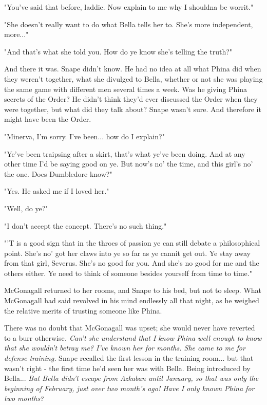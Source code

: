 "You've said that before, laddie. Now explain to me why I shouldna be worrit."

"She doesn't really want to do what Bella tells her to. She's more independent, more..."

"And that's what she told you. How do ye know she's telling the truth?"

And there it was. Snape didn't know. He had no idea at all what Phina did when they weren't together, what she divulged to Bella, whether or not she was playing the same game with different men several times a week. Was he giving Phina secrets of the Order? He didn't think they'd ever discussed the Order when they were together, but what did they talk about? Snape wasn't sure. And therefore it might have been the Order.

"Minerva, I'm sorry. I've been... how do I explain?"

"Ye've been traipsing after a skirt, that's what ye've been doing. And at any other time I'd be saying good on ye. But now's no' the time, and this girl's no' the one. Does Dumbledore know?"

"Yes. He asked me if I loved her."

"Well, do ye?"

"I don't accept the concept. There's no such thing."

"'T is a good sign that in the throes of passion ye can still debate a philosophical point. She's no' got her claws into ye so far as ye cannit get out. Ye stay away from that girl, Severus. She's no good for you. And she's no good for me and the others either. Ye need to think of someone besides yourself from time to time."

McGonagall returned to her rooms, and Snape to his bed, but not to sleep. What McGonagall had said revolved in his mind endlessly all that night, as he weighed the relative merits of trusting someone like Phina.

There was no doubt that McGonagall was upset; she would never have reverted to a burr otherwise\emph{. Can't she understand that I know Phina well enough to know that she wouldn't betray me? I've known her for months. She came to me for defense training.} Snape recalled the first lesson in the training room... but that wasn't right - the first time he'd seen her was with Bella. Being introduced by Bella... \emph{But Bella didn't escape from Azkaban until January, so that was only the beginning of February, just over two month's ago! Have I only known Phina for two months?}

